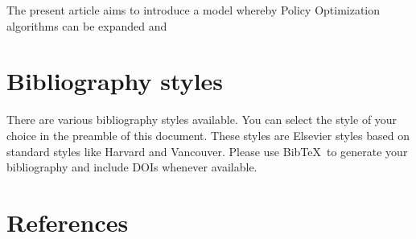 \documentclass[review]{elsarticle}
\begin{document}
The present article aims to introduce a model whereby Policy Optimization algorithms can be expanded and 

\section{Bibliography styles}

There are various bibliography styles available. You can select the style of your choice in the preamble of this document. These styles are Elsevier styles based on standard styles like Harvard and Vancouver. Please use Bib\TeX\ to generate your bibliography and include DOIs whenever available.

\section*{References}


\end{document}
